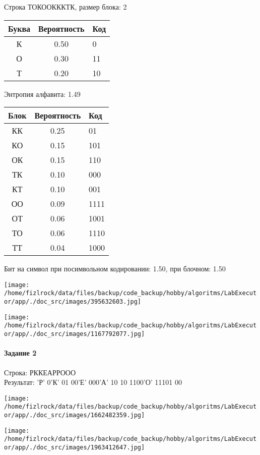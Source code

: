 \documentclass[a4paper, 12pt]{article}
\begin{document}
Строка ТОКООКККТК, размер блока: 2
\begin{center}
 \begin{tabular}{ |c|c|l| } 
  \hline
     Буква & Вероятность & Код\\ \hline
К & 0.50 & 0\\\hline
О & 0.30 & 11\\\hline
Т & 0.20 & 10
\\ \hline \end{tabular}
\end{center}
Энтропия алфавита: 1.49
\begin{center}
 \begin{tabular}{ |c|c|l| } 
  \hline
     Блок & Вероятность & Код\\ \hline
КК & 0.25 & 01\\\hline
КО & 0.15 & 101\\\hline
ОК & 0.15 & 110\\\hline
ТК & 0.10 & 000\\\hline
КТ & 0.10 & 001\\\hline
ОО & 0.09 & 1111\\\hline
ОТ & 0.06 & 1001\\\hline
ТО & 0.06 & 1110\\\hline
ТТ & 0.04 & 1000
\\ \hline \end{tabular}
\end{center}
Бит на символ при посимвольном кодировании: 1.50, при блочном: 1.50

\texttt{[image: /home/fizlrock/data/files/backup/code\_backup/hobby/algoritms/LabExecutor/app/./doc\_src/images/395632603.jpg]}

\texttt{[image: /home/fizlrock/data/files/backup/code\_backup/hobby/algoritms/LabExecutor/app/./doc\_src/images/1167792077.jpg]}
\pagebreak
\paragraph{Задание 2}

Строка: 
РККЕАРРООО\\
Результат: 'Р' 0'К' 01 00'Е' 000'А' 10 10 1100'О' 11101 00

\texttt{[image: /home/fizlrock/data/files/backup/code\_backup/hobby/algoritms/LabExecutor/app/./doc\_src/images/1662482359.jpg]}

\texttt{[image: /home/fizlrock/data/files/backup/code\_backup/hobby/algoritms/LabExecutor/app/./doc\_src/images/1963412647.jpg]}
\end{document}
